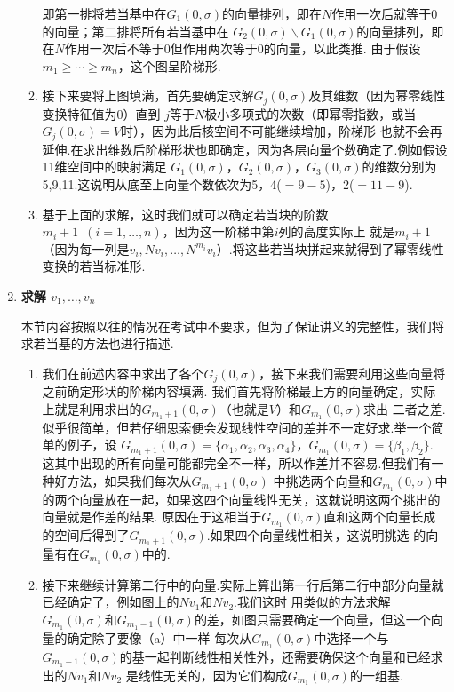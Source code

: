 \begin{enumerate}
\begin{enumerate}
        即第一排将若当基中在$G_1(0,\sigma)$的向量排列，即在$N$作用一次后就等于0的向量；第二排将所有若当基中在
        $G_2(0,\sigma)\backslash G_1(0,\sigma)$的向量排列，即在$N$作用一次后不等于0但作用两次等于0的向量，以此类推.
        由于假设$m_1\geqslant\cdots\geqslant m_n$，这个图呈阶梯形.
        \item 接下来要将上图填满，首先要确定求解$G_j(0,\sigma)$及其维数（因为幂零线性变换特征值为0）直到
        $j$等于$N$极小多项式的次数（即幂零指数，或当$G_j(0,\sigma)=V$时），因为此后核空间不可能继续增加，阶梯形
        也就不会再延伸.在求出维数后阶梯形状也即确定，因为各层向量个数确定了.例如假设11维空间中的映射满足
        $G_1(0,\sigma)$，$G_2(0,\sigma)$，$G_3(0,\sigma)$的维数分别为5,9,11.这说明从底至上向量个数依次为5，4($=9-5$)，2($=11-9$).
        \item 基于上面的求解，这时我们就可以确定若当块的阶数$m_i+1\enspace(i=1,\ldots,n)$，因为这一阶梯中第$i$列的高度实际上
        就是$m_i+1$（因为每一列是$v_i,Nv_i,\ldots,N^{m_i}v_i$）.将这些若当块拼起来就得到了幂零线性变换的若当标准形.
    \end{enumerate}
    \item \textbf{\heiti 求解 $v_1,\ldots,v_n$}

    本节内容按照以往的情况在考试中不要求，但为了保证讲义的完整性，我们将求若当基的方法也进行描述.
    \begin{enumerate}[label=(\arabic*)]
        \item 我们在前述内容中求出了各个$G_j(0,\sigma)$，接下来我们需要利用这些向量将之前确定形状的阶梯内容填满.
        我们首先将阶梯最上方的向量确定，实际上就是利用求出的$G_{m_1+1}(0,\sigma)$（也就是$V$）和$G_{m_1}(0,\sigma)$求出
        二者之差.似乎很简单，但若仔细思索便会发现线性空间的差并不一定好求.举一个简单的例子，设
        $G_{m_1+1}(0,\sigma)=\{\alpha_1,\alpha_2,\alpha_3,\alpha_4\}$，$G_{m_1}(0,\sigma)=\{\beta_1,\beta_2\}$.
        这其中出现的所有向量可能都完全不一样，所以作差并不容易.但我们有一种好方法，如果我们每次从$G_{m_1+1}(0,\sigma)$
        中挑选两个向量和$G_{m_1}(0,\sigma)$中的两个向量放在一起，如果这四个向量线性无关，这就说明这两个挑出的向量就是作差的结果.
        原因在于这相当于$G_{m_1}(0,\sigma)$直和这两个向量长成的空间后得到了$G_{m_1+1}(0,\sigma)$.如果四个向量线性相关，这说明挑选
        的向量有在$G_{m_1}(0,\sigma)$中的.
        \item 接下来继续计算第二行中的向量.实际上算出第一行后第二行中部分向量就已经确定了，例如图上的$Nv_1$和$Nv_2$.我们这时
        用类似的方法求解$G_{m_1}(0,\sigma)$和$G_{m_1-1}(0,\sigma)$的差，如图只需要确定一个向量，但这一个向量的确定除了要像（a）中一样
        每次从$G_{m_1}(0,\sigma)$中选择一个与$G_{m_1-1}(0,\sigma)$的基一起判断线性相关性外，还需要确保这个向量和已经求出的$Nv_1$和$Nv_2$
        是线性无关的，因为它们构成$G_{m_1}(0,\sigma)$的一组基.


\end{enumerate}
\end{enumerate}
